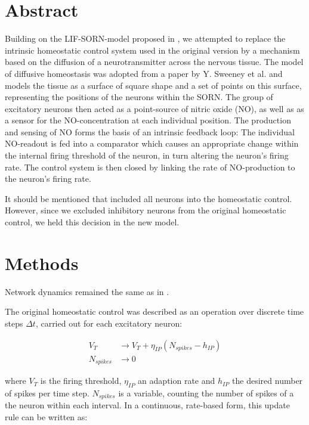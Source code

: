 \documentclass[10pt,a4paper]{article}
\begin{document}
\section{Abstract} \label{abstract}
Building on the LIF-SORN-model proposed in \cite{SORN_Paper}, we attempted to replace the intrinsic homeostatic control system used in the original version by a mechanism based on the diffusion of a neurotransmitter across the nervous tissue. The model of diffusive homeostasis was adopted from a paper by Y. Sweeney et al. \cite{Sweeney_Paper} and models the tissue as a surface of square shape and a set of points on this surface, representing the positions of the neurons within the SORN. The group of excitatory neurons then acted as a point-source of nitric oxide (NO), as well as as a sensor for the NO-concentration at each individual position. The production and sensing of NO forms the basis of an intrinsic feedback loop: The individual NO-readout is fed into a comparator which causes an appropriate change within the internal firing threshold of the neuron, in turn altering the neuron's firing rate. The control system is then closed by linking the rate of NO-production to the neuron's firing rate.

It should be mentioned that \cite{Sweeney_Paper} included all neurons into the homeostatic control. However, since we excluded inhibitory neurons from the original homeostatic control, we held this decision in the new model.

\section{Methods} \label{methods}
Network dynamics remained the same as in \cite{SORN_Paper}.

The original homeostatic control was described as an operation over discrete time steps $\Delta t$, carried out for each excitatory neuron:

\begin{align}
V_T &\rightarrow V_T + \eta_{IP} (N_{spikes} - h_{IP}) \label{can_hom_1}\\
N_{spikes} &\rightarrow 0 \label{can_hom_2}
\end{align}

where $V_T$ is the firing threshold, $\eta_{IP}$ an adaption rate and $h_{IP}$ the desired number of spikes per time step. $N_{spikes}$ is a variable, counting the number of spikes of a the neuron within each interval. In a continuous, rate-based form, this update rule can be written as:
\end{document}
